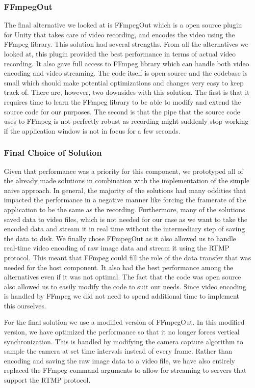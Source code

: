 \subsubsection{FFmpegOut}
The final alternative we looked at is FFmpegOut\cite{ffmpegOut} which is a open source plugin for Unity that takes care of video recording, and encodes the video using the FFmpeg\cite{ffmpeg} library. This solution had several strengths. From all the alternatives we looked at, this plugin provided the best performance in terms of actual video recording. It also gave full access to FFmpeg library which can handle both video encoding and video streaming. The code itself is open source and the codebase is small which should make potential optimizations and changes very easy to keep track of. There are, however, two downsides with this solution. The first is that it requires time to learn the FFmpeg library to be able to modify and extend the source code for our purposes. The second is that the pipe that the source code uses to FFmpeg is not perfectly robust as recording might suddenly stop working if the application window is not in focus for a few seconds.  

\subsubsection{Final Choice of Solution}
Given that performance was a priority for this component, we prototyped all of the already made solutions in combination with the implementation of the simple naive approach. In general, the majority of the solutions had many oddities that impacted the performance in a negative manner like forcing the framerate of the application to be the same as the recording. Furthermore, many of the solutions saved data to video files, which is not needed for our case as we want to take the encoded data and stream it in real time without the intermediary step of saving the data to disk. We finally chose FFmpegOut as it also allowed us to handle real-time video encoding of raw image data and stream it using the RTMP protocol. This meant that FFmpeg could fill the role of the data transfer that was needed for the host component. It also had the best performance among the alternatives even if it was not optimal. The fact that the code was open source also allowed us to easily modify the code to suit our needs. Since video encoding is handled by FFmpeg we did not need to spend additional time to implement this ourselves. 

For the final solution we use a modified version of FFmpegOut. In this modified version, we have optimized the performance so that it no longer forces vertical synchronization. This is handled by modifying the camera capture algorithm to sample the camera at set time intervals instead of every frame. Rather than encoding and saving the raw image data to a video file, we have also entirely replaced the FFmpeg command arguments to allow for streaming to servers that support the RTMP protocol. 
    
